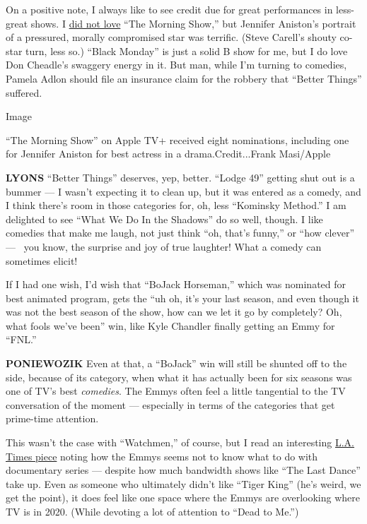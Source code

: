 On a positive note, I always like to see credit due for great
performances in less-great shows. I
\href{https://www.nytimes.com/2019/10/30/arts/television/the-morning-show-apple.html}{did
not love} ``The Morning Show,'' but Jennifer Aniston's portrait of a
pressured, morally compromised star was terrific. (Steve Carell's shouty
co-star turn, less so.) ``Black Monday'' is just a solid B show for me,
but I do love Don Cheadle's swaggery energy in it. But man, while I'm
turning to comedies, Pamela Adlon should file an insurance claim for the
robbery that ``Better Things'' suffered.

Image

``The Morning Show'' on Apple TV+ received eight nominations, including
one for Jennifer Aniston for best actress in a drama.Credit...Frank
Masi/Apple

\textbf{LYONS} ``Better Things'' deserves, yep, better. ``Lodge 49''
getting shut out is a bummer --- I wasn't expecting it to clean up, but
it was entered as a comedy, and I think there's room in those categories
for, oh, less ``Kominsky Method.'' I am delighted to see ``What We Do In
the Shadows'' do so well, though. I like comedies that make me laugh,
not just think ``oh, that's funny,'' or ``how clever'' ---~ you know,
the surprise and joy of true laughter! What a comedy can sometimes
elicit!

If I had one wish, I'd wish that ``BoJack Horseman,'' which was
nominated for best animated program, gets the ``uh oh, it's your last
season, and even though it was not the best season of the show, how can
we let it go by completely? Oh, what fools we've been'' win, like Kyle
Chandler finally getting an Emmy for ``FNL.''

\textbf{PONIEWOZIK} Even at that, a ``BoJack'' win will still be shunted
off to the side, because of its category, when what it has actually been
for six seasons was one of TV's best \emph{comedies}. The Emmys often
feel a little tangential to the TV conversation of the moment ---
especially in terms of the categories that get prime-time attention.

This wasn't the case with ``Watchmen,'' of course, but I read an
interesting
\href{https://www.latimes.com/entertainment-arts/tv/story/2020-07-27/emmys-2020-nominations-tiger-king-the-last-dance-cheer-mcmillions}{L.A.
Times piece} noting how the Emmys seems not to know what to do with
documentary series --- despite how much bandwidth shows like ``The Last
Dance'' take up. Even as someone who ultimately didn't like ``Tiger
King'' (he's weird, we get the point), it does feel like one space where
the Emmys are overlooking where TV is in 2020. (While devoting a lot of
attention to ``Dead to Me.'')


